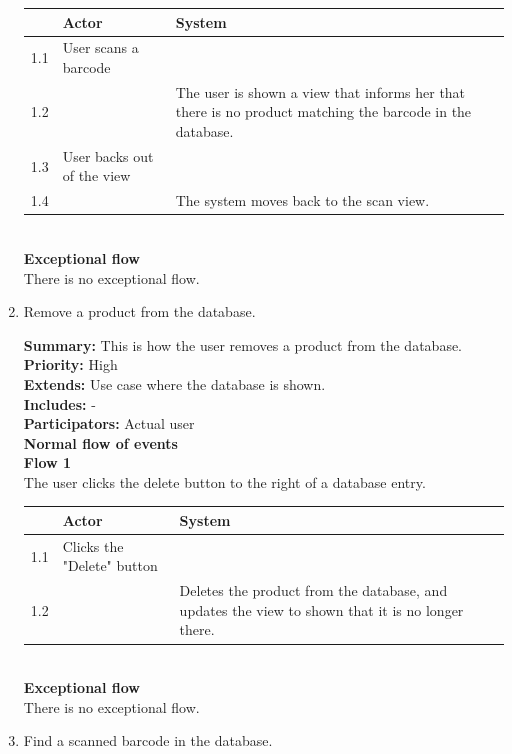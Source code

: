 \documentclass{report}
\begin{document}
\begin{enumerate}
    \begin{tabular}{ | l | p{4cm} | p{4cm} |}
    \hline
      & Actor & System \\ \hline
    1.1 & User scans a barcode & \\ \hline
    1.2 & & The user is shown a view that informs her that there is no product matching the barcode in the database. \\ \hline
    1.3 & User backs out of the view & \\ \hline
    1.4 & & The system moves back to the scan view. \\
    \hline
    \end{tabular} \\

    \textbf{Exceptional flow} \\ There is no exceptional flow.

  \item Remove a product from the database. \

    \textbf{Summary:} This is how the user removes a product from the database. \\
    \textbf{Priority:} High \\
    \textbf{Extends:} Use case where the database is shown. \\
    \textbf{Includes:} - \\
    \textbf{Participators:} Actual user \\
    \textbf{Normal flow of events} \\
    \textbf{Flow 1} \\ The user clicks the delete button to the right of a database entry. \\

    \begin{tabular}{ | l | p{4cm} | p{4cm} |}
    \hline
      & Actor & System \\ \hline
    1.1 & Clicks the "Delete" button & \\ \hline
    1.2 & & Deletes the product from the database, and updates the view to shown that it is no longer there. \\
    \hline
    \end{tabular} \\

    \textbf{Exceptional flow} \\ There is no exceptional flow.

  \item Find a scanned barcode in the database. \


\end{enumerate}
\end{document}
